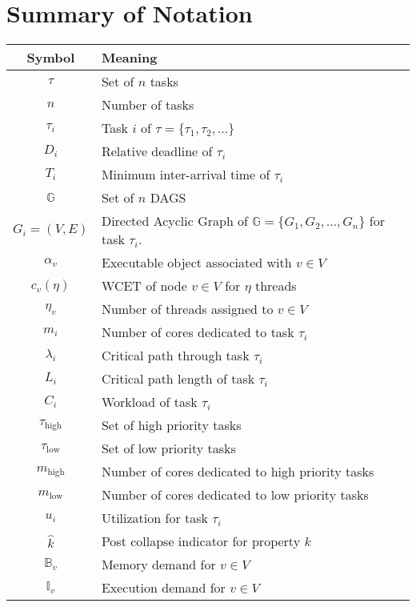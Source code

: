 \section{Summary of Notation}
\begin{table}[ht]
  \begin{tabular}{|c|l|}
    \hline
    \textbf{Symbol} & \textbf{Meaning} \\
    \hline
    ${\tau}$ & Set of ${n}$ tasks \\
    \hline
    ${n}$ & Number of tasks \\
    \hline
    ${\tau_i}$ & Task ${i}$ of ${\tau = \{\tau_1, \tau_2, ... \}}$ \\
    \hline
    ${D_i}$ & Relative deadline of ${\tau_i}$ \\
    \hline
    ${T_i}$ & Minimum inter-arrival time of ${\tau_i}$ \\
    \hline
    ${\mathbb{G}}$ & Set of ${n}$ DAGS \\
    \hline
    ${G_i = (V, E)}$ & Directed Acyclic Graph of
        ${\mathbb{G} = \{G_1, G_2, ..., G_n\}}$ for task ${\tau_i}$. \\
    \hline
    ${\alpha_v}$ & Executable object associated with ${v \in V}$
    \\
    \hline
    ${c_v(\eta)}$ &  WCET of node ${v \in V}$ for ${\eta}$ threads
    \\
    \hline
    ${\eta_v}$ & Number of threads assigned to ${v \in V}$ \\
    \hline
    ${m_i}$ & Number of cores dedicated to task ${\tau_i}$ \\
    \hline
    ${\lambda_i}$ & Critical path through task ${\tau_i}$ \\
    \hline
    ${L_i}$ & Critical path length of task ${\tau_i}$ \\
    \hline
    ${C_i}$ & Workload of task ${\tau_i}$ \\
    \hline
    ${\tau_{\text{high}}}$ & Set of high priority tasks \\
    \hline
    ${\tau_{\text{low}}}$ & Set of low priority tasks \\
    \hline
    ${m_{\text{high}}}$ & Number of cores dedicated to high
    priority tasks \\
    \hline
    ${m_{\text{low}}}$ & Number of cores dedicated to low priority
    tasks \\
    \hline
    ${u_i}$ & Utilization for task ${\tau_i}$ \\
    \hline
    ${\hat{k}}$ & Post collapse indicator for property ${k}$ \\
    \hline
    ${\mathbb{B}_v}$ & Memory demand for ${v \in V}$ \\
    \hline
    ${\mathbb{I}_v}$ & Execution demand for ${v \in V}$ \\
    \hline
  \end{tabular}
\end{table}
